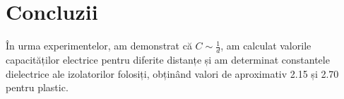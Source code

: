 \documentclass[12pt]{article}
\begin{document}
\section{Concluzii}

În urma experimentelor, am demonstrat că \( C \sim \frac{1}{d} \), am calculat valorile capacităților electrice pentru diferite distanțe și am determinat constantele dielectrice ale izolatorilor folosiți, obținând valori de aproximativ 2.15 și 2.70 pentru plastic.
\end{document}
